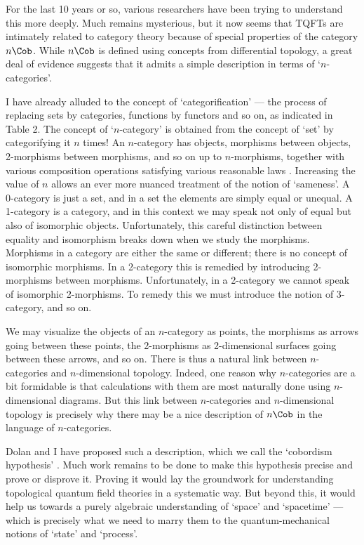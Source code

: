 For the last 10 years or so, various researchers have been trying to
understand this more deeply.  Much remains mysterious, but it now seems
that TQFTs are intimately related to category theory because of special
properties of the category $n\Cob$.  While $n\Cob$ is defined using
concepts from differential topology, a great deal of evidence suggests
that it admits a simple description in terms of `$n$-categories'.

I have already alluded to the concept of `categorification' --- the
process of replacing sets by categories, functions by functors and so
on, as indicated in Table 2.   The concept of `$n$-category' is obtained
from the concept of `set' by categorifying it $n$ times!   An
$n$-category has objects, morphisms between objects, 2-morphisms between
morphisms, and so on up to $n$-morphisms, together with various
composition operations satisfying various reasonable laws \cite{B2}.  
Increasing the value of $n$ allows an ever more nuanced treatment of
the notion of `sameness'.  A 0-category is just a set, and in a set 
the elements are simply equal or unequal.  A 1-category is a category, 
and in this context we may speak not only of equal but also of isomorphic 
objects.  Unfortunately, this careful distinction between equality and 
isomorphism breaks down when we study the morphisms.  Morphisms in a 
category are either the same or different; there is no concept of 
isomorphic morphisms.  In a 2-category this is remedied by introducing 
2-morphisms between morphisms.  Unfortunately, in a 2-category we cannot 
speak of isomorphic 2-morphisms.  To remedy this we must introduce the 
notion of 3-category, and so on.

We may visualize the objects of an $n$-category as points, the morphisms
as arrows going between these points, the 2-morphisms as 2-dimensional
surfaces going between these arrows, and so on.  There is thus a natural
link between $n$-categories and $n$-dimensional topology.  Indeed, one
reason why $n$-categories are a bit formidable is that calculations with
them are most naturally done using $n$-dimensional diagrams.   But this
link between $n$-categories and $n$-dimensional topology is precisely
why there may be a nice description of $n\Cob$ in the language of
$n$-categories.   

Dolan and I have proposed such a description, which we call the
`cobordism hypothesis' \cite{BD}.  Much work remains to be done to
make this hypothesis precise and prove or disprove it.  Proving it would
lay the groundwork for understanding topological quantum field theories
in a systematic way.  But beyond this, it would help us towards a
purely algebraic understanding of `space' and `spacetime' --- which is
precisely what we need to marry them to the quantum-mechanical notions of
`state' and `process'.  

